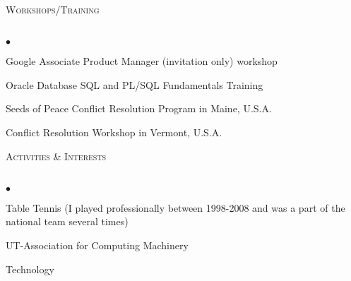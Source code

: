 \documentclass[11pt]{article}
\newcommand{\lineunder}{\vspace*{-8pt} \\ \hspace*{-18pt} \hrulefill \\}
\newcommand{\header}[1]{{\hspace*{-15pt}\vspace*{6pt} \textsc{#1}} \vspace*{-6pt} \lineunder}
\newcommand{\person}[5]{\textbf{#1} $\cdot$ #2 $\cdot$ #3 \\ Tel: #4 $\cdot$ Email: #5 \\}
\newenvironment{achievements}
{
  \begin{list}{$\bullet$}{\topsep 0pt \itemsep -2pt}}{\vspace*{4pt}\end{list}
}
\begin{document}
\header{Workshops/Training}
\begin{achievements}
  \item  Google Associate Product Manager (invitation only) workshop
  \item Oracle Database SQL and PL/SQL Fundamentals Training
  \item Seeds of Peace Conflict Resolution Program in Maine, U.S.A.
  \item  Conflict Resolution Workshop in Vermont, U.S.A.
\end{achievements}

\header{Activities \& Interests}
\begin{achievements}
  \item Table Tennis (I played professionally between 1998-2008 and was a part of the national team several times)
  \item UT-Association for Computing Machinery
  \item Technology
\end{achievements}

\end{document}
